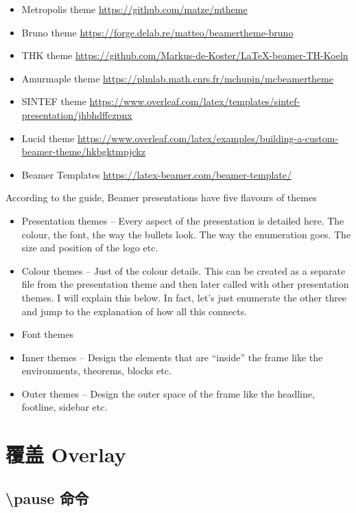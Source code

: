 \begin{column}{0.5\textwidth}
\begin{itemize}
  \item Metropolis theme \url{https://github.com/matze/mtheme}
  \item Bruno theme \url{https://forge.delab.re/matteo/beamertheme-bruno}
  \item THK theme \url{https://github.com/Markus-de-Koster/LaTeX-beamer-TH-Koeln}
  \item Amurmaple theme \url{https://plmlab.math.cnrs.fr/mchupin/mcbeamertheme}
  \item SINTEF theme \url{https://www.overleaf.com/latex/templates/sintef-presentation/jhbhdffczpnx}
  \item Lucid theme \url{https://www.overleaf.com/latex/examples/building-a-custom-beamer-theme/hkbgktmpjckz}
  \item Beamer Templates \url{https://latex-beamer.com/beamer-template/}
\end{itemize}

According to the guide, Beamer presentations have five flavours of themes

\begin{itemize}
  \item Presentation themes – Every aspect of the presentation is detailed here. The colour, the font, the way the bullets look. The way the enumeration goes. The size and position of the logo etc.
  \item Colour themes – Just of the colour details. This can be created as a separate file from the presentation theme and then later called with other presentation themes. I will explain this below. In fact, let’s just enumerate the other three and jump to the explanation of how all this connects.
  \item Font themes
  \item Inner themes – Design the elements that are “inside” the frame like the environments, theorems, blocks etc.
  \item Outer themes – Design the outer space of the frame like the headline, footline, sidebar etc. 
\end{itemize}

\section{覆盖 Overlay}

\subsection{{\ttfamily \textbackslash pause} 命令}


\end{column}
